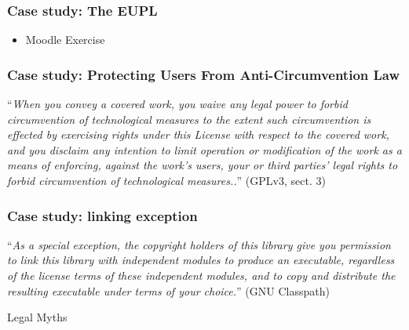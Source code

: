 \begin{frame}
\frametitle{Case study: The EUPL}


\begin{itemize}
\item Moodle Exercise 
\end{itemize}

\end{frame}


\begin{frame}
\frametitle{Case study: Protecting Users From Anti-Circumvention Law}

\small
``\textit{When you convey a covered work, you waive any legal power to forbid circumvention of technological measures to the extent such circumvention is effected by exercising rights under this License with respect to the covered work, and you disclaim any intention to limit operation or modification of the work as a means of enforcing, against the work's users, your or third parties' legal rights to forbid circumvention of technological measures..}'' (GPLv3, sect. 3)


\end{frame}


\begin{frame}
\frametitle{Case study: linking exception}

``\textit{As a special exception, the copyright holders of this library give you permission to link this library with independent modules to produce an executable, regardless of the license terms of these independent modules, and to copy and distribute the resulting executable under terms of your choice.}'' (GNU Classpath)

\end{frame}



\begin{frame}

\begin{center}
\huge{Legal Myths}
\end{center}

\end{frame}




